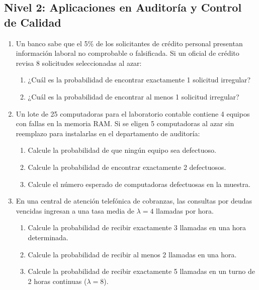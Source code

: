 \subsection*{Nivel 2: Aplicaciones en Auditoría y Control de Calidad}
\begin{enumerate}[resume]
    \item Un banco sabe que el 5\% de los solicitantes de crédito personal presentan información laboral no comprobable o falsificada. Si un oficial de crédito revisa 8 solicitudes seleccionadas al azar:
    \begin{enumerate}[label=\alph*)]
        \item ¿Cuál es la probabilidad de encontrar exactamente 1 solicitud irregular?
        \item ¿Cuál es la probabilidad de encontrar al menos 1 solicitud irregular?
    \end{enumerate}
    \item Un lote de 25 computadoras para el laboratorio contable contiene 4 equipos con fallas en la memoria RAM. Si se eligen 5 computadoras al azar sin reemplazo para instalarlas en el departamento de auditoría:
    \begin{enumerate}[label=\alph*)]
        \item Calcule la probabilidad de que ningún equipo sea defectuoso.
        \item Calcule la probabilidad de encontrar exactamente 2 defectuosos.
        \item Calcule el número esperado de computadoras defectuosas en la muestra.
    \end{enumerate}
    \item En una central de atención telefónica de cobranzas, las consultas por deudas vencidas ingresan a una tasa media de $\lambda = 4$ llamadas por hora.
    \begin{enumerate}[label=\alph*)]
        \item Calcule la probabilidad de recibir exactamente 3 llamadas en una hora determinada.
        \item Calcule la probabilidad de recibir al menos 2 llamadas en una hora.
        \item Calcule la probabilidad de recibir exactamente 5 llamadas en un turno de 2 horas continuas ($\lambda = 8$).
    \end{enumerate}
\end{enumerate}


